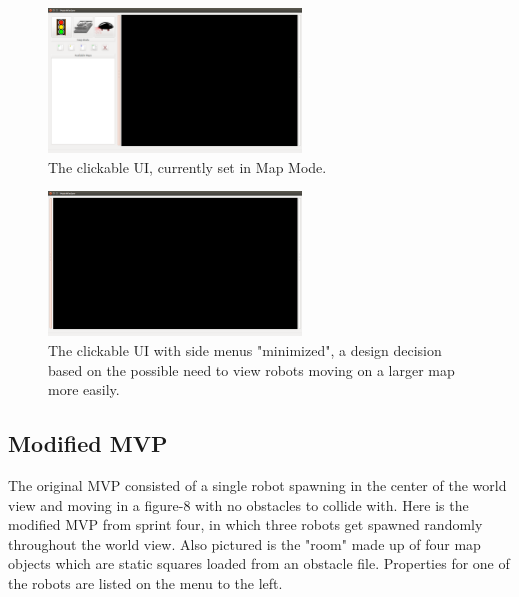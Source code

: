 \begin{figure}[H]
	\begin{center}
		\includegraphics[width=0.60\textwidth]{./Images/Sprint1_clickableUI_MapMode}
	\end{center}
	\caption{The clickable UI, currently set in Map Mode. \label{clickableuimap}}
\end{figure}

\begin{figure}[H]
	\begin{center}
		\includegraphics[width=0.60\textwidth]{./Images/Sprint1_clickableUI_NoMenus}
	\end{center}
	\caption{The clickable UI with side menus "minimized", a design decision based on the possible need to view robots moving on a larger map more easily. \label{clickableuinomenus}}
\end{figure}

\subsection{Modified MVP}

The original MVP consisted of a single robot spawning in the center of the world view and moving in a figure-8 with no obstacles to collide with. Here is the modified MVP from sprint four, in which three robots get spawned randomly throughout the world view. Also pictured is the "room" made up of four map objects which are static squares loaded from an obstacle file. Properties for one of the robots are listed on the menu to the left.

